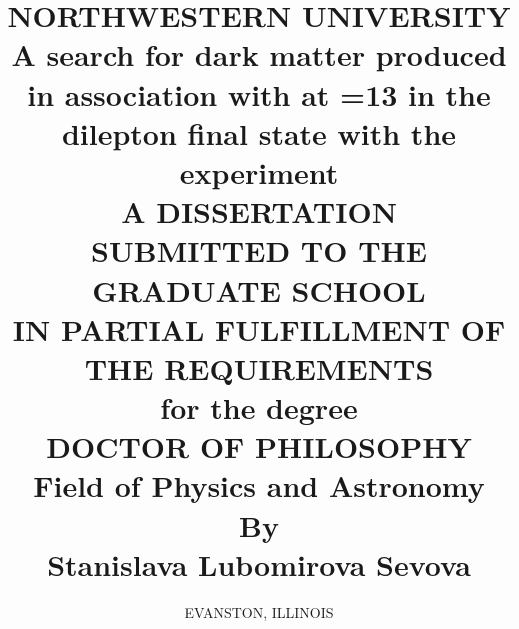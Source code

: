 \documentclass[hyperpdf,bindnopdf]{hepthesis}
\title{
  \normalsize
  \uppercase{Northwestern University} 
  \\
  \vspace{0.7 cm} 
  A search for dark matter produced in association with \ttbar at \sqrtS=\unit{13}{\TeV} in the dilepton final state with the \CMS experiment
  \\ 
  \vspace{0.7 cm}
  \uppercase{A Dissertation} \\
  \vspace{0.7 cm}
  \uppercase{Submitted to the graduate school \\ in partial fulfillment of the requirements} \\
  \vspace{0.7 cm}
  \small{for the degree} \\
  \vspace{0.7 cm}
  \uppercase{Doctor of Philosophy} \\
  \vspace{0.7 cm}
  Field of Physics and Astronomy \\
  \vspace{1.0 cm}
  By\\
  \vspace{0.3cm}
  Stanislava Lubomirova Sevova
}
\author{\normalsize \uppercase{Evanston, Illinois}}%
\begin{document}
\begin{frontmatter}
  
\end{frontmatter}

\begin{mainmatter}
  
  
  
\end{mainmatter}

\begin{appendices}
  
\end{appendices}

\begin{backmatter}
  
\end{backmatter}

\end{document}
